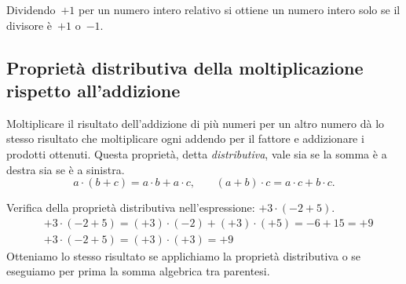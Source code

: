 Dividendo~$+1$ per un numero intero relativo si ottiene un numero intero solo se il divisore è~$+1$ o~$-1$.

\subsection{Proprietà distributiva della moltiplicazione rispetto all'addizione}
Moltiplicare il risultato dell'addizione di più numeri per un altro numero dà lo stesso risultato
che moltiplicare ogni addendo per il fattore e addizionare i prodotti ottenuti. Questa proprietà,
detta \emph{distributiva}, vale sia se la somma è a destra sia se è a sinistra.
\[a\cdot(b+c)=a\cdot b+a\cdot c\text{,}\qquad (a+b)\cdot c=a\cdot c+b\cdot c.\]

\begin{exrig}
 \begin{esempio}
 Verifica della proprietà distributiva nell'espressione: $+3\cdot(-2+5)$.
 \begin{align*}
 &+3\cdot(-2+5)=(+3)\cdot(-2)+(+3)\cdot(+5)=-6+15=+9\\
 &+3\cdot(-2+5)=(+3)\cdot(+3)=+9
 \end{align*}
Otteniamo lo stesso risultato se applichiamo la proprietà distributiva o se eseguiamo per prima la somma algebrica tra parentesi.
 \end{esempio}
\end{exrig}

\ovalbox{\risolvii \ref{ese:2.28}, \ref{ese:2.29}}

\newpage

\cleardoublepage
